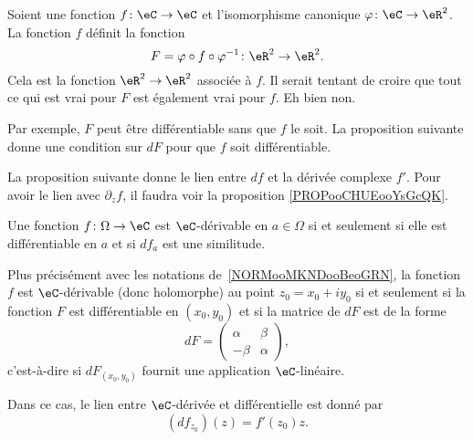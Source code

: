 \begin{normaltext}      \label{NORMooMKNDooBeoGRN}
	Soient une fonction \( f\colon \eC\to \eC\) et l'isomorphisme canonique \( \varphi\colon \eC\to \eR^2\). La fonction \( f\) définit la fonction
	\begin{equation}
		F=\varphi \circ f\circ \varphi^{-1}\colon \eR^2\to \eR^2.
	\end{equation}
	Cela est la fonction \( \eR^2\to \eR^2\) associée à \( f\). Il serait tentant de croire que tout ce qui est vrai pour \( F\) est également vrai pour \( f\). Eh bien non.

	Par exemple, \( F\) peut être différentiable sans que \( f\) le soit. La proposition suivante donne une condition sur \( dF\) pour que \( f\) soit différentiable.
\end{normaltext}

La proposition suivante donne le lien entre \( df\) et la dérivée complexe \( f'\). Pour avoir le lien avec \( \partial_zf\), il faudra voir la proposition \ref{PROPooCHUEooYsGcQK}.
\begin{proposition}     \label{PropKJUDooJfqgYS}
	Une fonction \( f\colon \Omega\to \eC\) est \( \eC\)-dérivable en \( a\in\Omega\) si et seulement si elle est différentiable en \( a\) et si \( df_a\) est une similitude.

	Plus précisément avec les notations de~\ref{NORMooMKNDooBeoGRN}, la fonction \( f\) est \( \eC\)-dérivable (donc holomorphe) au point \( z_0=x_0+iy_0\) si et seulement si la fonction \( F\) est différentiable en \( (x_0,y_0)\) et si la matrice de \( dF\) est de la forme
	\begin{equation}        \label{EQooWZGKooLDEHGr}
		dF=\begin{pmatrix}
			\alpha & \beta  \\
			-\beta & \alpha
		\end{pmatrix},
	\end{equation}
	c'est-à-dire si \( dF_{(x_0,y_0)}\) fournit une application \( \eC\)-linéaire.

	Dans ce cas, le lien entre \( \eC\)-dérivée et différentielle est donné par
	\begin{equation}        \label{EqPAEFooYNhYpz}
		(df_{z_0})(z)=f'(z_0)z.
	\end{equation}
\end{proposition}

